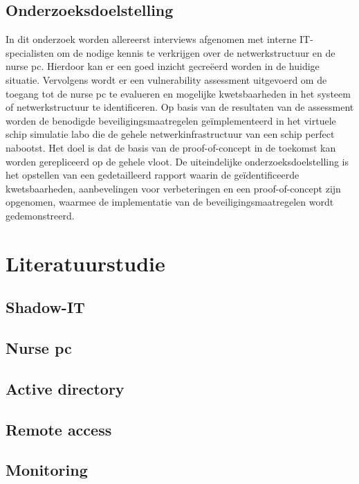 \subsection{Onderzoeksdoelstelling}
In dit onderzoek worden allereerst interviews afgenomen met interne IT-specialisten om de nodige kennis te verkrijgen over de netwerkstructuur en de nurse pc. Hierdoor kan er een goed inzicht gecreëerd worden in de huidige situatie. 
Vervolgens wordt er een vulnerability assessment uitgevoerd om de toegang tot de nurse pc te evalueren en mogelijke kwetsbaarheden in het systeem of netwerkstructuur te identificeren.
Op basis van de resultaten van de assessment worden de benodigde beveiligingsmaatregelen geïmplementeerd in het virtuele schip simulatie labo die de gehele netwerkinfrastructuur van een schip perfect nabootst. Het doel is dat de basis van de proof-of-concept in de toekomst kan worden gerepliceerd op de gehele vloot.
De uiteindelijke onderzoeksdoelstelling is het opstellen van een gedetailleerd rapport waarin de geïdentificeerde kwetsbaarheden, aanbevelingen voor verbeteringen en een proof-of-concept zijn opgenomen, waarmee de implementatie van de beveiligingsmaatregelen wordt 
gedemonstreerd. 


\section{Literatuurstudie}%
\label{sec:literatuurstudie}
\subsection{Shadow-IT}
\subsection{Nurse pc}
\subsection{Active directory}
\subsection{Remote access}
\subsection{Monitoring}



